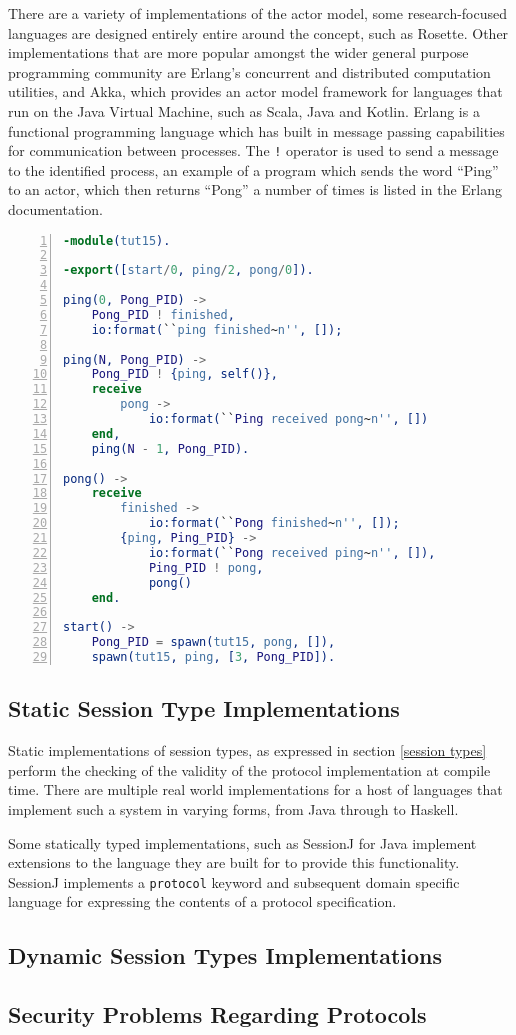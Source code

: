 \documentclass{article}
\begin{document}
	There are a variety of implementations of the actor model, some research-focused languages are designed entirely entire around the concept, such as Rosette\cite{Tomlinson:1988:ROC:67387.67410}. Other implementations that are more popular amongst the wider general purpose programming community are Erlang’s concurrent and distributed computation utilities, and Akka, which provides an actor model framework for languages that run on the Java Virtual Machine, such as Scala, Java and Kotlin. 
	Erlang is a functional programming language which has built in message passing capabilities for communication between processes. The \texttt{!} operator is used to send a message to the identified process, an example of a program which sends the word “Ping” to an actor, which then returns “Pong” a number of times is listed in the Erlang documentation\cite{ErlangConcDocs}.
	\begin{lstlisting}[language=erlang, frame=single, numbers=left, caption=Ping Pong in concurrent Erlang\cite{ErlangConcDocs}]
-module(tut15).

-export([start/0, ping/2, pong/0]).

ping(0, Pong_PID) ->
	Pong_PID ! finished,
	io:format(``ping finished~n'', []);

ping(N, Pong_PID) ->
	Pong_PID ! {ping, self()},
	receive
		pong ->
			io:format(``Ping received pong~n'', [])
	end,
	ping(N - 1, Pong_PID).

pong() ->
	receive
		finished ->
			io:format(``Pong finished~n'', []);
		{ping, Ping_PID} ->
			io:format(``Pong received ping~n'', []),
			Ping_PID ! pong,
			pong()
	end.

start() ->
	Pong_PID = spawn(tut15, pong, []),
	spawn(tut15, ping, [3, Pong_PID]).
	\end{lstlisting}
	\subsection{Static Session Type Implementations}
	Static implementations of session types, as expressed in section \ref{session types} perform the checking of the validity of the protocol implementation at compile time. There are multiple real world implementations for a host of languages that implement such a system in varying forms, from Java through to Haskell\cite{lindley2016embedding}. 
	
	Some statically typed implementations, such as SessionJ\cite{Hu:2010:TES:1883978.1884001} for Java implement extensions to the language they are built for to provide this functionality. SessionJ implements a \texttt{protocol} keyword and subsequent domain specific language for expressing the contents of a protocol specification.
	\subsection{Dynamic Session Types Implementations}
	\subsection{Security Problems Regarding Protocols}
	\pagebreak
	\printbibliography
\end{document}
